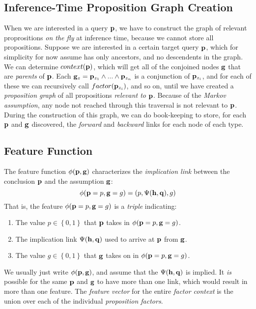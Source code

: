 \documentclass[11pt]{article}
\newcommand{\pvariable}{{\bf p}}
\newcommand{\qvariable}{{\bf q}}
\newcommand{\gvariable}{{\bf g}}
\newcommand{\hvariable}{{\bf h}}
\begin{document}
\subsection{Inference-Time Proposition Graph Creation}
When we are interested in a query $\pvariable$, we have to construct the graph of relevant proprositions {\em on the fly} at inference time, because we cannot store all propositions.
Suppose we are interested in a certain target query $\pvariable$, which for simplicity for now assume has only ancestors, and no descendents in the graph.
We can determine $context(\pvariable)$, which will get all of the conjoined nodes $\gvariable$ that are {\em parents} of $\pvariable$.
Each $\gvariable_z = \pvariable_{z_1} \wedge ... \wedge \pvariable_{z_n}$ is a conjunction of $\pvariable_{z_i}$, and for each of these we can recursively call $factor(\pvariable_{z_i})$, and so on, until we have created a {\em proposition graph} of all propositions {\em relevant to} $\pvariable$.
Because of the {\em Markov assumption}, any node not reached through this traversal is not relevant to $\pvariable$.
During the construction of this graph, we can do book-keeping to store, for each $\pvariable$ and $\gvariable$ discovered, the {\em forward} and {\em backward} links for each node of each type.

\subsection{Feature Function}
\label{s:feature_function}
The feature function $\phi(\pvariable, \gvariable)$ characterizes the {\em implication link} between the conclusion $\pvariable$ and the assumption $\gvariable$:
\begin{equation}
    \phi(\pvariable = p, \gvariable = g) = (p, \Psi(\hvariable, \qvariable), g) 
\end{equation}
That is, the feature $\phi(\pvariable = p, \gvariable = g)$ is a {\em triple} indicating:
\begin{enumerate}
    \item The value $p \in \left\{0, 1\right\}$ that $\pvariable$ takes in $\phi(\pvariable = p, \gvariable = g)$.
    \item The implication link $\Psi(\hvariable, \qvariable)$ used to arrive at $\pvariable$ from $\gvariable$.
    \item The value $g \in \left\{0, 1\right\}$ that $\gvariable$ takes on in $\phi(\pvariable = p, \gvariable = g)$.
\end{enumerate}
We usually just write $\phi(\pvariable, \gvariable)$, and assume that the $\Psi(\hvariable, \qvariable)$ is implied.
It {\em is} possible for the same $\pvariable$ and $\gvariable$ to have more than one link, which would result in more than one feature.
The {\em feature vector} for the entire {\em factor context} is the union over each of the individual {\em proposition factors}.
\end{document}
